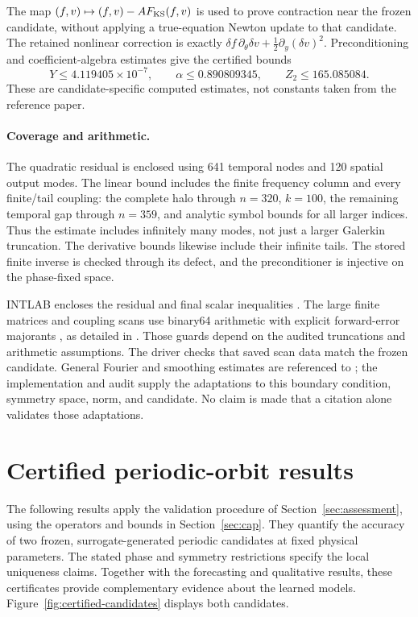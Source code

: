 \documentclass[11pt]{article}
\begin{document}
The map $(f,v)\mapsto(f,v)-AF_{\rm KS}(f,v)$ is used to prove contraction
near the frozen candidate, without applying a true-equation Newton update to
that candidate. The retained nonlinear correction is exactly
$\delta f\,\partial_\theta\delta v+\tfrac12\partial_y(\delta v)^2$.
Preconditioning and coefficient-algebra estimates give the certified bounds
\begin{equation}
 Y\leq4.119405\times10^{-7},\qquad
 \alpha\leq0.890809345,\qquad Z_2\leq165.085084.
 \label{eq:ks-method-bounds}
\end{equation}
These are candidate-specific computed estimates, not constants taken from
the reference paper.

\paragraph{Coverage and arithmetic.}
The quadratic residual is enclosed using 641 temporal nodes and 120 spatial
output modes. The linear bound includes the finite frequency column and every
finite/tail coupling: the complete halo through $n=320$, $k=100$, the remaining
temporal gap through $n=359$, and analytic symbol bounds for all larger
indices. Thus the estimate includes infinitely many modes, not just a larger
Galerkin truncation. The derivative bounds likewise include their infinite
tails. The stored finite inverse is checked through its defect, and the
preconditioner is injective on the phase-fixed space.

INTLAB encloses the residual and final scalar inequalities \cite{rump1999}.
The large finite matrices and coupling scans use binary64 arithmetic with
explicit forward-error majorants \cite{higham2002}, as detailed in
. Those guards depend on the audited
truncations and arithmetic assumptions. The driver checks that saved scan data
match the frozen candidate. General Fourier and smoothing estimates are
referenced to \citet{figueras2017,validatedDFT2026}; the implementation and audit
supply the adaptations to this boundary condition, symmetry space, norm, and
candidate. No claim is made that a citation alone validates those adaptations.

\section{Certified periodic-orbit results}
\label{sec:cap-results}
The following results apply the validation procedure of
Section~\ref{sec:assessment}, using the operators and bounds in
Section~\ref{sec:cap}. They quantify the accuracy of two frozen,
surrogate-generated periodic candidates at fixed physical parameters.
The stated phase and symmetry restrictions specify the local uniqueness
claims. Together with the forecasting and qualitative results, these
certificates provide complementary evidence about the learned models.
Figure~\ref{fig:certified-candidates} displays both candidates.
\end{document}
